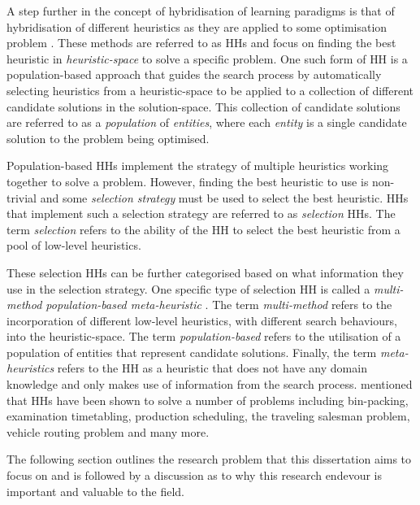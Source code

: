 A step further in the concept of hybridisation of learning paradigms is that of hybridisation of different heuristics as they are applied to some optimisation problem \cite{ref:burke:2013}. These methods are referred to as \acfp{HH} and focus on finding the best heuristic in \textit{heuristic-space} to solve a specific problem. One such form of \ac{HH} is a population-based approach that guides the search process by automatically selecting heuristics from a heuristic-space to be applied to a collection of different candidate solutions in the solution-space. This collection of candidate solutions are referred to as a \textit{population} of \textit{entities}, where each \textit{entity} is a single candidate solution to the problem being optimised.

Population-based \acp{HH} implement the strategy of multiple heuristics working together to solve a problem. However, finding the best heuristic to use is non-trivial and some \textit{selection strategy} must be used to select the best heuristic. \acp{HH} that implement such a selection strategy are referred to as \textit{selection} \acp{HH}. The term \textit{selection} refers to the ability of the \ac{HH} to select the best heuristic from a pool of low-level heuristics.

These selection \acp{HH} can be further categorised based on what information they use in the selection strategy. One specific type of selection \ac{HH} is called a \textit{multi-method population-based meta-heuristic} \cite{ref:vanderstockt:2018}. The term \textit{multi-method} refers to the incorporation of different low-level heuristics, with different search behaviours, into the heuristic-space. The term \textit{population-based} refers to the utilisation of a population of entities that represent candidate solutions. Finally, the term \textit{meta-heuristics} refers to the \ac{HH} as a heuristic that does not have any domain knowledge and only makes use of information from the search process. \citeauthor{ref:grobler:2015} \cite{ref:grobler:2015} mentioned that \acp{HH} have been shown to solve a number of problems including bin-packing, examination timetabling, production scheduling, the traveling salesman problem, vehicle routing problem and many more.

The following section outlines the research problem that this dissertation aims to focus on and is followed by a discussion as to why this research endevour is important and valuable to the field.


